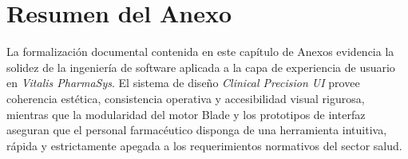 \section{Resumen del Anexo}

La formalización documental contenida en este capítulo de Anexos evidencia la solidez de la ingeniería de software aplicada a la capa de experiencia de usuario en \textit{Vitalis PharmaSys}. El sistema de diseño \textit{Clinical Precision UI} provee coherencia estética, consistencia operativa y accesibilidad visual rigurosa, mientras que la modularidad del motor Blade y los prototipos de interfaz aseguran que el personal farmacéutico disponga de una herramienta intuitiva, rápida y estrictamente apegada a los requerimientos normativos del sector salud.

